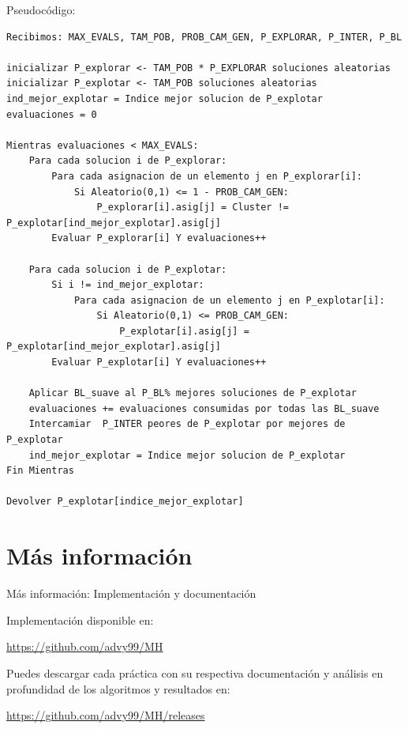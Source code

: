 \documentclass{beamer}
\begin{document}
\begin{frame}[fragile]{Pseudocódigo:}
\tiny{
\begin{lstlisting}
Recibimos: MAX_EVALS, TAM_POB, PROB_CAM_GEN, P_EXPLORAR, P_INTER, P_BL

inicializar P_explorar <- TAM_POB * P_EXPLORAR soluciones aleatorias
inicializar P_explotar <- TAM_POB soluciones aleatorias
ind_mejor_explotar = Indice mejor solucion de P_explotar
evaluaciones = 0

Mientras evaluaciones < MAX_EVALS:
	Para cada solucion i de P_explorar:
		Para cada asignacion de un elemento j en P_explorar[i]:
			Si Aleatorio(0,1) <= 1 - PROB_CAM_GEN:
				P_explorar[i].asig[j] = Cluster != P_explotar[ind_mejor_explotar].asig[j]
		Evaluar P_explorar[i] Y evaluaciones++
		
	Para cada solucion i de P_explotar:
		Si i != ind_mejor_explotar:
			Para cada asignacion de un elemento j en P_explotar[i]:
				Si Aleatorio(0,1) <= PROB_CAM_GEN:
					P_explotar[i].asig[j] = P_explotar[ind_mejor_explotar].asig[j]
		Evaluar P_explotar[i] Y evaluaciones++
		
	Aplicar BL_suave al P_BL% mejores soluciones de P_explotar
	evaluaciones += evaluaciones consumidas por todas las BL_suave	
	Intercamiar  P_INTER peores de P_explotar por mejores de P_explotar
	ind_mejor_explotar = Indice mejor solucion de P_explotar
Fin Mientras

Devolver P_explotar[indice_mejor_explotar]

\end{lstlisting}
}

\end{frame}
  
\section{Más información}
  
\begin{frame}{Más información: Implementación y documentación}

	Implementación disponible en: 
	
	\begin{center}
		\url{https://github.com/advy99/MH}	
	\end{center}
	
	Puedes descargar cada práctica con su respectiva documentación y análisis en profundidad de los algoritmos y resultados en:
	
	\begin{center}
		\url{https://github.com/advy99/MH/releases}	
	\end{center}

	
\end{frame}	  
  
\end{document}
